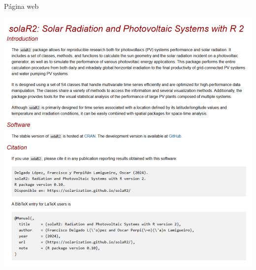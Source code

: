 \documentclass[aspectratio=169, usenames,svgnames,dvipsnames]{beamer}
\begin{document}
\begin{frame}[label={sec:org44b5127}]{Página web}
\begin{center}
\href{https://solarization.github.io/solaR2/}{\includegraphics[height=0.9\textheight]{../figuras/github.io.png}}
\end{center}
\end{frame}
\end{document}
